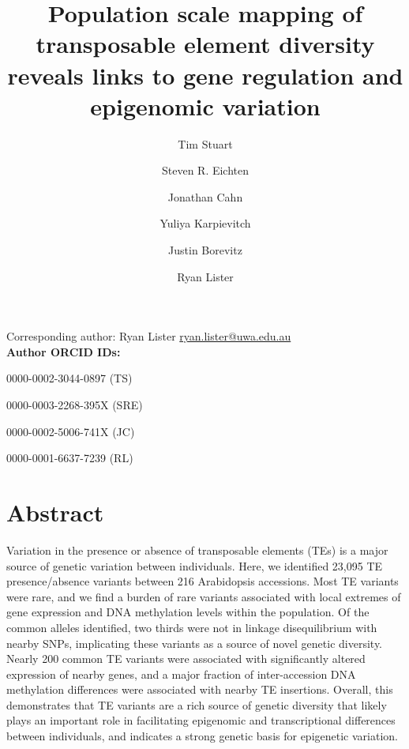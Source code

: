 \documentclass[12pt]{article}
\date{}
\begin{document}
\title{Population scale mapping of transposable element diversity reveals links to gene regulation and epigenomic variation}

\author[1]{Tim Stuart}
\author[2]{Steven R. Eichten}
\author[1]{Jonathan Cahn}
\author[1]{Yuliya Karpievitch}
\author[2]{Justin Borevitz}
\author[1]{Ryan Lister}

\renewcommand\Authands{ and }

\maketitle

Corresponding author: Ryan Lister \href{mailto:ryan.lister@uwa.edu.au}{ryan.lister@uwa.edu.au} \\

\textbf{Author ORCID IDs:}

0000-0002-3044-0897 (TS)

0000-0003-2268-395X (SRE)

0000-0002-5006-741X (JC)

0000-0001-6637-7239 (RL)


\linenumbers

\section{Abstract}

Variation in the presence or absence of transposable elements (TEs) is
a major source of genetic variation between individuals. Here, we
identified 23,095 TE presence/absence variants between 216 Arabidopsis
accessions. Most TE variants were rare, and we find a burden of rare
variants associated with local extremes of gene expression and DNA
methylation levels within the population. Of the common alleles
identified, two thirds were not in linkage disequilibrium with nearby
SNPs, implicating these variants as a source of novel genetic
diversity.  Nearly 200 common TE variants were associated with
significantly altered expression of nearby genes, and a major fraction
of inter-accession DNA methylation differences were associated with
nearby TE insertions.  Overall, this demonstrates that TE variants are
a rich source of genetic diversity that likely plays an important role
in facilitating epigenomic and transcriptional differences between
individuals, and indicates a strong genetic basis for epigenetic
variation.
\end{document}
